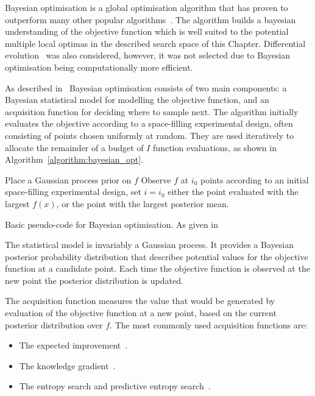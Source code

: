 Bayesian optimisation is a global optimisation
algorithm that has proven to outperform many other popular
algorithms~\cite{Jones2001}. The algorithm builds a bayesian understanding of
the objective function which is well suited to the potential multiple local optimas in
the described search space of this Chapter. Differential evolution~\cite{Storn1997}
was also considered, however, it was not selected due to Bayesian optimisation being
computationally more efficient.

As described in~\cite{Frazier2018} Bayesian optimisation consists of two main
components: a Bayesian statistical model for modelling the objective function,
and an acquisition function for deciding where to sample next. The algorithm
initially evaluates the objective according to a space-filling experimental
design, often consisting of points chosen uniformly at random. They are used
iteratively to allocate the remainder of a budget of \(I\) function evaluations, as
shown in Algorithm~\ref{algorithm:bayesian_opt}.

\begin{algorithm}[H]
Place a Gaussian process prior on \(f\)\;
Observe \(f\) at \(i_0\) points according to an initial space-filling experimental design, set \(i = i_0\) \;
\Return either the point evaluated with the largest \(f(x)\), or the point with the largest posterior mean.
\caption{Basic pseudo-code for Bayesian optimisation. As given in~\cite{Frazier2018}}\label{algorithm:bayesian_opt}
\end{algorithm}

The statistical model is invariably a Gaussian process. It provides a Bayesian
posterior probability distribution that describes potential values for the
objective function at a candidate point. Each time the objective function is
observed at the new point the posterior distribution is updated.

The acquisition function measures the value that would be generated by
evaluation of the objective function at a new point, based on the current
posterior distribution over \(f\). The most commonly used acquisition
functions are:

\begin{itemize}
    \item The expected improvement~\cite{Jones1998}.
    \item The knowledge gradient~\cite{Frazier2009}.
    \item The entropy search and predictive entropy search~\cite{Hennig2012}.
\end{itemize}

